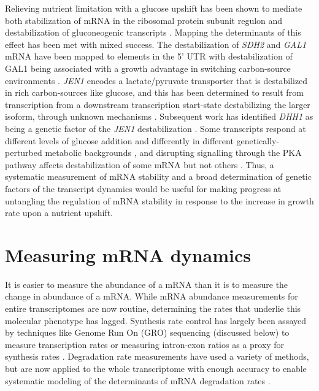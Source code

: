 Relieving nutrient limitation with a glucose upshift has
been shown to mediate both stabilization of mRNA in the ribosomal
protein subunit regulon 
\parencite{yin2003glucose}
and destabilization of
gluconeogenic transcripts 
\parencite{de2002role,mercado1994levels,scheffler1998control,lombardo1992control}. 
Mapping the
determinants of this effect has been met with mixed success. The
destabilization of \textit{SDH2} and \textit{GAL1} mRNA have been 
mapped to elements in the 5' UTR 
\parencite{scheffler1998control,bennett2008metabolic}
with destabilization of GAL1 being
associated with a growth advantage in switching carbon-source
environments \parencite{baumgartner2011antagonistic}. 
\textit{JEN1} encodes a lactate/pyruvate transporter that is
destabilized in rich carbon-sources like glucose, and this has been
determined to result from transcription from a downstream
transcription start-state destabilizing the larger isoform, through
unknown mechanisms \parencite{andrade2005multiple}.
Subsequent work has identified \textit{DHH1} as being a genetic 
factor of the \textit{JEN1} destabilization \parencite{mota2014role}. 
Some transcripts respond at different levels of glucose
addition and differently in different genetically-perturbed metabolic
backgrounds 
\parencite{yin2000differential}, and disrupting signalling through the
PKA pathway affects destabilization of some mRNA but not others 
\parencite{yin2003glucose}. 
Thus, a systematic measurement of mRNA stability and a
broad determination of genetic factors of the transcript dynamics
would be useful for making progress at untangling the regulation of
mRNA stability in response to the increase in growth rate upon a
nutrient upshift.  

\section{Measuring mRNA dynamics}

It is easier to measure the abundance of a mRNA than it is to 
measure the change in abundance of a mRNA. While mRNA
abundance measurements for entire transcriptomes are now routine,
determining the rates that underlie this molecular phenotype has
lagged. Synthesis rate control has largely been assayed by techniques
like Genome Run On (GRO) sequencing (discussed below) to measure
transcription rates or measuring intron-exon ratios 
\parencite{gray2014snapshot} as a proxy for synthesis rates 
\parencite{perez2013eukaryotic}.
Degradation rate measurements have used a variety of methods, but are
now applied to the whole transcriptome with enough accuracy to enable
systematic modeling of the determinants of mRNA degradation rates
\parencite{perez2013eukaryotic,neymotin2016multiple,cheng2017cis}.

